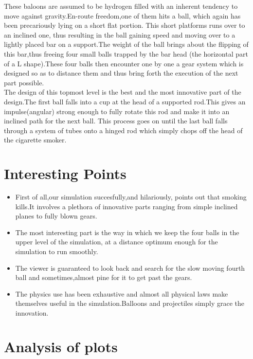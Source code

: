 \documentclass[11pt]{article}
\begin{document}
These baloons are assumed to be hydrogen filled with an inherent tendency to move against gravity.En-route freedom,one of them hits a ball,
which again has been precariously lying on a short flat portion. This short platforms runs over to an inclined one,
thus resulting in the ball gaining speed and moving over to a lightly placed bar on a support.The weight of the ball brings
about the flipping of this bar,thus freeing four small balls trapped by the bar head (the horizontal part of a L shape).These four balls 
then encounter one by one a gear system which is designed so as to distance them and thus bring forth the execution of the next part possible.\\

The design of this topmost level is the best and the most innovative part of the design.The first ball falls into a cup at the head of a
supported rod.This gives an impulse(angular) strong enough to fully rotate this rod and make it into an inclined path for the next ball.
This process goes on until the last ball falls through a system of tubes onto a hinged rod which simply chops off the head of the cigarette smoker.\\ 


\section{Interesting Points}

\begin{itemize}
\item First of all,our simulation succesfully,and hilariously, points out that smoking kills.It involves a plethora of innovative parts ranging from simple inclined planes to fully blown gears. 
\item The most interesting part is the way in which we keep the four balls in the upper level of the simulation, at a distance optimum enough for the simulation to run smoothly.
\item The viewer is guaranteed to look back and search for the slow moving fourth ball and sometimes,almost pine for it to get past the gears.
\item The physics use has been exhaustive and almost all physical laws make themselves useful in the simulation.Balloons and projectiles simply grace the innovation.  
\end{itemize}   

\section{Analysis of plots}
\end{document}
